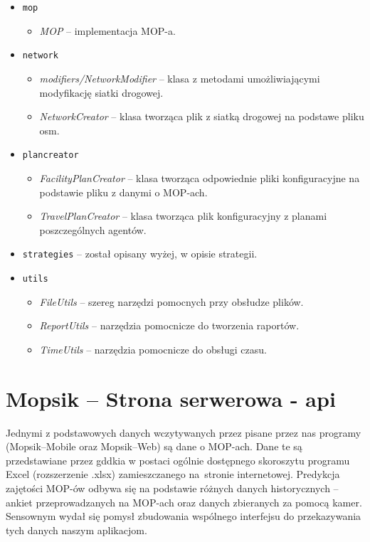 \begin{itemize}
\begin{itemize}
        \end{itemize}
    \item \texttt{mop}
        \begin{itemize}
            \item \textit{MOP} -- implementacja MOP-a.
        \end{itemize}
    \item \texttt{network}
        \begin{itemize}
            \item \textit{modifiers/NetworkModifier} -- klasa z metodami umożliwiającymi modyfikację siatki drogowej.
            \item \textit{NetworkCreator} -- klasa tworząca plik z siatką drogowej na podstawe pliku osm.
        \end{itemize}
    \item \texttt{plancreator}
        \begin{itemize}
            \item \textit{FacilityPlanCreator} -- klasa tworząca odpowiednie pliki konfiguracyjne na podstawie pliku z danymi o MOP-ach.
            \item \textit{TravelPlanCreator} -- klasa tworząca plik konfiguracyjny z planami poszczególnych agentów.
        \end{itemize}
    \item \texttt{strategies} -- został opisany wyżej, w opisie strategii.
    \item \texttt{utils}
        \begin{itemize}
            \item \textit{FileUtils} -- szereg narzędzi pomocnych przy obsłudze plików.
            \item \textit{ReportUtils} -- narzędzia pomocnicze do tworzenia raportów.
            \item \textit{TimeUtils} -- narzędzia pomocnicze do obsługi czasu.
        \end{itemize}        
    
\end{itemize}
\chapter{Mopsik -- Strona serwerowa - \acrshort{api}}\label{r:apka} 

Jednymi z podstawowych danych wczytywanych przez pisane przez nas programy (Mopsik--Mobile oraz Mopsik--Web) są dane o MOP-ach. Dane te są przedstawiane przez \acrshort{gddkia} w postaci ogólnie dostępnego skoroszytu programu Excel (rozszerzenie .xlsx) zamieszczanego na~stronie internetowej.
Predykcja zajętości MOP-ów odbywa się na podstawie różnych danych historycznych -- ankiet przeprowadzanych na MOP-ach oraz danych zbieranych za pomocą kamer.
Sensownym wydał się pomysł zbudowania wspólnego interfejsu do przekazywania tych danych naszym aplikacjom. 

